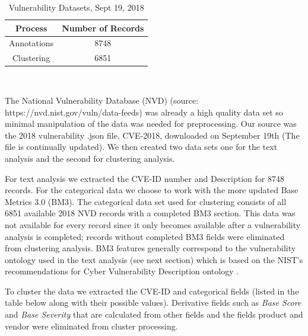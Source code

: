 \documentclass{article} %
\begin{document}
\begin{table}[h!]
\begin{center} 
\begin{tabular}{ |c|c|  } \hline
 Process & Number of Records \\ \hline
 Annotations & 8748  \\  \hline
 Clustering & 6851  \\   \hline
\end{tabular} \\
\label{table:1}
\end{center}
\label{table:1}
\caption{Vulnerability Datasets, Sept 19, 2018} 
\end{table}

The National Vulnerability Database (NVD) (source:  https://nvd.nist.gov/vuln/data-feeds) was already a high quality data set so minimal manipulation of the data was needed for preprocessing. Our source was the 2018 vulnerability .json file, CVE-2018, downloaded on September 19th (The file is continually updated). We then created two data sets one for the text analysis and the second for clustering analysis.  

For text analysis we extracted the CVE-ID number and Description for 8748 records.  For the categorical data we choose to work with the more updated Base Metrics 3.0 (BM3). The categorical data set used for clustering consists of all 6851 available 2018 NVD records with a completed BM3 section.  This data was not available for every record since it only becomes available after a vulnerability analysis is completed; records without completed BM3 fields were eliminated from clustering analysis.  BM3 features generally correspond to the vulnerability ontology used in the text analysis (see next section) which is based on the NIST's recommendations for Cyber Vulnerability Description ontology \cite{Booth2016DraftOntology}.

To cluster the data we extracted the CVE-ID and categorical fields (listed in the table below along with their possible values).  Derivative fields such as \textit{Base Score} and \textit{Base Severity} that are calculated from other fields and the fields product and vendor were eliminated from cluster processing.    
\end{document}

